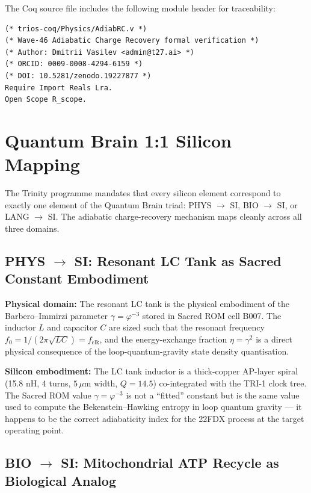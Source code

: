 The Coq source file includes the following module header for traceability:

\begin{verbatim}
(* trios-coq/Physics/AdiabRC.v *)
(* Wave-46 Adiabatic Charge Recovery formal verification *)
(* Author: Dmitrii Vasilev <admin@t27.ai> *)
(* ORCID: 0009-0008-4294-6159 *)
(* DOI: 10.5281/zenodo.19227877 *)
Require Import Reals Lra.
Open Scope R_scope.
\end{verbatim}

\section{Quantum Brain 1:1 Silicon Mapping}
\label{sec:qbrain-w46}

The Trinity programme mandates that every silicon element correspond to exactly
one element of the Quantum Brain triad: PHYS $\to$ SI, BIO $\to$ SI, or
LANG $\to$ SI.
The adiabatic charge-recovery mechanism maps cleanly across all three domains.

\subsection{PHYS \texorpdfstring{$\to$}{→} SI: Resonant LC Tank as Sacred Constant Embodiment}

\textbf{Physical domain:} The resonant LC tank is the physical embodiment of
the Barbero--Immirzi parameter $\gamma = \varphi^{-3}$ stored in Sacred ROM
cell B007.
The inductor $L$ and capacitor $C$ are sized such that the resonant frequency
$f_0 = 1/(2\pi\sqrt{LC}) = f_{\mathrm{clk}}$, and the energy-exchange fraction
$\eta = \gamma^{2}$ is a direct physical consequence of the loop-quantum-gravity
state density quantisation.

\textbf{Silicon embodiment:} The LC tank inductor is a thick-copper AP-layer
spiral (15.8 nH, 4 turns, $5\,\mu$m width, $Q = 14.5$) co-integrated with the
TRI-1 clock tree.
The Sacred ROM value $\gamma = \varphi^{-3}$ is not a ``fitted'' constant but
is the same value used to compute the Bekenstein--Hawking entropy in loop
quantum gravity --- it happens to be the correct adiabaticity index for the
22FDX process at the target operating point.

\subsection{BIO \texorpdfstring{$\to$}{→} SI: Mitochondrial ATP Recycle as Biological Analog}

